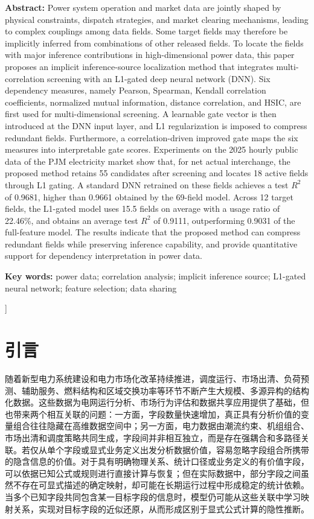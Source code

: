 \documentclass[UTF8,zihao=5,twoside]{ctexart}
\numberwithin{equation}{section}
\newcommand{\fundcn}{基金项目：无。}
\newcommand{\funden}{Foundation item: None.}
\begin{document}
\noindent\textbf{Abstract:} Power system operation and market data are jointly shaped by physical constraints, dispatch strategies, and market clearing mechanisms, leading to complex couplings among data fields. Some target fields may therefore be implicitly inferred from combinations of other released fields. To locate the fields with major inference contributions in high-dimensional power data, this paper proposes an implicit inference-source localization method that integrates multi-correlation screening with an L1-gated deep neural network (DNN). Six dependency measures, namely Pearson, Spearman, Kendall correlation coefficients, normalized mutual information, distance correlation, and HSIC, are first used for multi-dimensional screening. A learnable gate vector is then introduced at the DNN input layer, and L1 regularization is imposed to compress redundant fields. Furthermore, a correlation-driven improved gate maps the six measures into interpretable gate scores. Experiments on the 2025 hourly public data of the PJM electricity market show that, for net actual interchange, the proposed method retains 55 candidates after screening and locates 18 active fields through L1 gating. A standard DNN retrained on these fields achieves a test $R^2$ of 0.9681, higher than 0.9661 obtained by the 69-field model. Across 12 target fields, the L1-gated model uses 15.5 fields on average with a usage ratio of 22.46\%, and obtains an average test $R^2$ of 0.9111, outperforming 0.9031 of the full-feature model. The results indicate that the proposed method can compress redundant fields while preserving inference capability, and provide quantitative support for dependency interpretation in power data.\par
\noindent\textbf{Key words:} power data; correlation analysis; implicit inference source; L1-gated neural network; feature selection; data sharing\par\vspace{0.8em}

\noindent{\small\fundcn\\\funden}
\vspace{0.8em}
]

\section{引言}
随着新型电力系统建设和电力市场化改革持续推进，调度运行、市场出清、负荷预测、辅助服务、燃料结构和区域交换功率等环节不断产生大规模、多源异构的结构化数据\cite{ref-liu-cps,ref-ma-pjm,ref-fan-pjm}。这些数据为电网运行分析、市场行为评估和数据共享应用提供了基础\cite{ref-zhu-sharing}，但也带来两个相互关联的问题：一方面，字段数量快速增加，真正具有分析价值的变量组合往往隐藏在高维数据空间中；另一方面，电力数据由潮流约束、机组组合、市场出清和调度策略共同生成，字段间并非相互独立，而是存在强耦合和多路径关联。若仅从单个字段或显式业务定义出发分析数据价值，容易忽略字段组合所携带的隐含信息的价值。对于具有明确物理关系、统计口径或业务定义的有价值字段，可以依据已知公式或规则进行直接计算与恢复；但在实际数据中，部分字段之间虽然不存在可显式描述的确定映射，却可能在长期运行过程中形成稳定的统计依赖。当多个已知字段共同包含某一目标字段的信息时，模型仍可能从这些关联中学习映射关系，实现对目标字段的近似还原，从而形成区别于显式公式计算的隐性推断。
\end{document}
